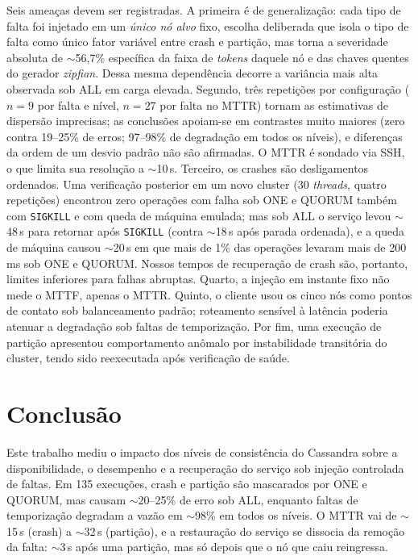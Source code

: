 \documentclass[runningheads]{llncs}
\begin{document}
Seis ameaças devem ser registradas. A primeira é de generalização: cada tipo de
falta foi injetado em um \emph{único nó alvo} fixo, escolha deliberada que
isola o tipo de falta como único fator variável entre crash e partição, mas torna
a severidade absoluta de $\sim$56,7\% específica da faixa de \emph{tokens} daquele
nó e das chaves quentes do gerador \emph{zipfian}. Dessa mesma dependência decorre
a variância mais alta observada sob ALL em carga elevada. Segundo, três
repetições por configuração ($n=9$ por falta e nível, $n=27$ por falta no MTTR)
tornam as estimativas de dispersão imprecisas; as conclusões apoiam-se em
contrastes muito maiores (zero contra 19--25\% de erros; 97--98\% de degradação
em todos os níveis), e diferenças da ordem de um desvio padrão não são
afirmadas. O
MTTR é sondado via SSH, o que limita sua resolução a $\sim$10\,s. Terceiro, os
crashes são desligamentos ordenados. Uma verificação posterior em um novo cluster
(30 \emph{threads}, quatro repetições) encontrou zero operações com falha sob ONE
e QUORUM também com \texttt{SIGKILL} e com queda de máquina emulada; mas sob ALL
o serviço levou $\sim$48\,s para retornar após \texttt{SIGKILL} (contra
$\sim$18\,s após parada ordenada), e a queda de máquina causou $\sim$20\,s em
que mais de 1\% das operações levaram mais de 200\,ms sob ONE e QUORUM. Nossos
tempos de recuperação de crash são, portanto, limites inferiores para falhas
abruptas. Quarto, a injeção em instante fixo não mede o MTTF, apenas o MTTR.
Quinto, o cliente usou os cinco
nós como pontos de contato sob balanceamento padrão; roteamento sensível à
latência poderia atenuar a degradação sob faltas de temporização. Por fim, uma
execução de partição apresentou comportamento anômalo por instabilidade
transitória do cluster, tendo sido reexecutada após verificação de saúde.

\section{Conclusão}
\label{sec:conclusion}

Este trabalho mediu o impacto dos níveis de consistência do Cassandra sobre a
disponibilidade, o desempenho e a recuperação do serviço sob injeção controlada
de faltas. Em 135 execuções, crash e partição são mascarados por ONE e QUORUM,
mas causam $\sim$20--25\% de erro sob ALL, enquanto faltas de temporização
degradam a vazão em $\sim$98\% em todos os níveis. O MTTR vai de $\sim$15\,s
(crash) a $\sim$32\,s (partição), e a restauração do serviço se dissocia da
remoção da falta: $\sim$3\,s após uma partição, mas só depois que o nó que caiu
reingressa.
\end{document}

